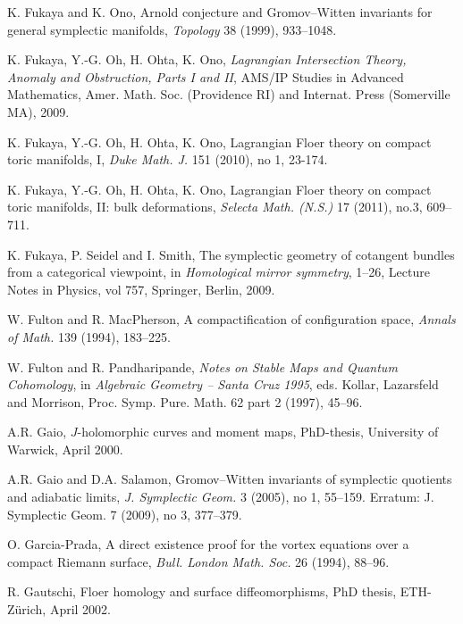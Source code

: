 K. Fukaya and K. Ono, Arnold conjecture and Gromov–Witten invariants for general symplectic manifolds, \emph{Topology} 38 (1999), 933–1048.

 K. Fukaya, Y.-G. Oh, H. Ohta, K. Ono, \emph{Lagrangian Intersection Theory, Anomaly and Obstruction, Parts I and II}, AMS/IP Studies in Advanced Mathematics, Amer. Math. Soc. (Providence RI) and Internat. Press (Somerville MA), 2009.

 K. Fukaya, Y.-G. Oh, H. Ohta, K. Ono, Lagrangian Floer theory on compact toric manifolds, I, \emph{Duke Math. J.} 151 (2010), no 1, 23-174.

 K. Fukaya, Y.-G. Oh, H. Ohta, K. Ono, Lagrangian Floer theory on compact toric manifolds, II: bulk deformations, \emph{Selecta Math. (N.S.)} 17 (2011), no.3, 609–711.

 K. Fukaya, P. Seidel and I. Smith, The symplectic geometry of cotangent bundles from a categorical viewpoint, in \emph{Homological mirror symmetry}, 1–26, Lecture Notes in Physics, vol 757, Springer, Berlin, 2009.

 W. Fulton and R. MacPherson, A compactification of configuration space, \emph{Annals of Math.} 139 (1994), 183–225.

 W. Fulton and R. Pandharipande, \emph{Notes on Stable Maps and Quantum Cohomology}, in \emph{Algebraic Geometry – Santa Cruz 1995}, eds. Kollar, Lazarsfeld and Morrison, Proc. Symp. Pure. Math. 62 part 2 (1997), 45–96.

 A.R. Gaio, $J$-holomorphic curves and moment maps, PhD-thesis, University of Warwick, April 2000.

 A.R. Gaio and D.A. Salamon, Gromov–Witten invariants of symplectic quotients and adiabatic limits, \emph{J. Symplectic Geom.} 3 (2005), no 1, 55–159. Erratum: J. Symplectic Geom. 7 (2009), no 3, 377–379.

 O. Garcia-Prada, A direct existence proof for the vortex equations over a compact Riemann surface, \emph{Bull. London Math. Soc.} 26 (1994), 88–96.

 R. Gautschi, Floer homology and surface diffeomorphisms, PhD thesis, ETH-Zürich, April 2002.
